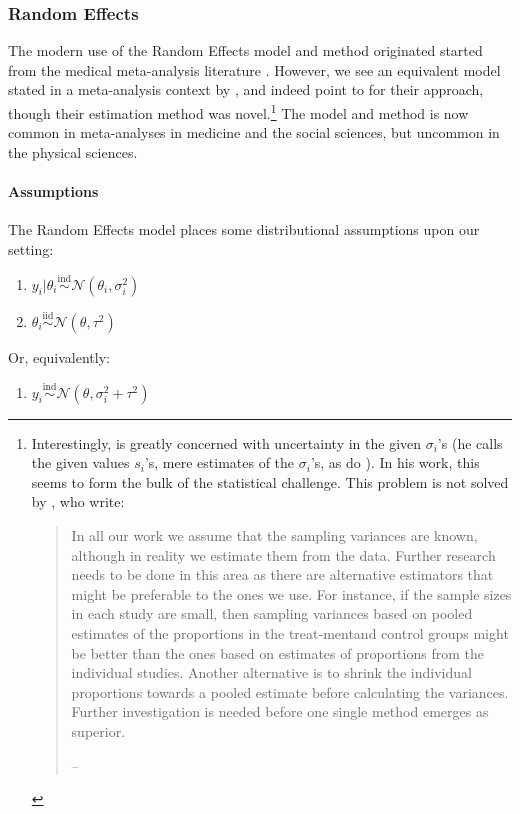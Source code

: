\documentclass[letterpaper,12pt]{article}
\begin{document}
\subsubsection{Random Effects}\label{sec:re}

The modern use of the Random Effects model and method originated started from the medical meta-analysis literature \citep{dersimonian1986meta}. However, we see an equivalent model stated in a meta-analysis context by \citet{cochran1937problems}, and indeed \citet{dersimonian2015meta} point to \citet{cochran1954combination} for their approach, though their estimation method was novel.\footnote{
Interestingly, \citet{cochran1937problems,cochran1954combination} is greatly concerned with uncertainty in the given $\sigma_i$'s (he calls the given values $s_i$'s, mere estimates of the $\sigma_i$'s, as do \citet{dersimonian1986meta}). In his work, this seems to form the bulk of the statistical challenge. This problem is not solved by \citet{dersimonian1986meta}, who write:
\begin{quote}
In all our work we assume that the sampling variances are known, although in reality we estimate them from the data. Further research needs to be done in this area as there are alternative estimators that might be preferable to the ones we use. For instance, if the sample sizes in each study are small, then sampling variances based on pooled estimates of the proportions in the treat-mentand control groups might be better than the ones based on estimates of proportions from the individual studies. Another alternative is to shrink the individual proportions towards a pooled estimate before calculating the variances. Further investigation is needed before one single method emerges as superior.

\hfill{}--\citet{dersimonian1986meta}
\end{quote}
} The model and method is now common in meta-analyses in medicine and the social sciences, but uncommon in the physical sciences.

\paragraph{Assumptions}\label{assumptions}

The Random Effects model places some distributional assumptions upon our setting:

\begin{enumerate}
\item
  $y_i|\theta_i\overset{\mathrm{ind}}{\sim}\mathcal{N}(\theta_i,\sigma_i^2)$
\item
  $\theta_i\overset{\mathrm{iid}}{\sim}\mathcal{N}(\theta,\tau^2)$
\end{enumerate}
Or, equivalently:
\begin{enumerate}
  \item $y_i\overset{\mathrm{ind}}{\sim}\mathcal{N}(\theta,\sigma_i^2+\tau^2)$
\end{enumerate}
\end{document}
